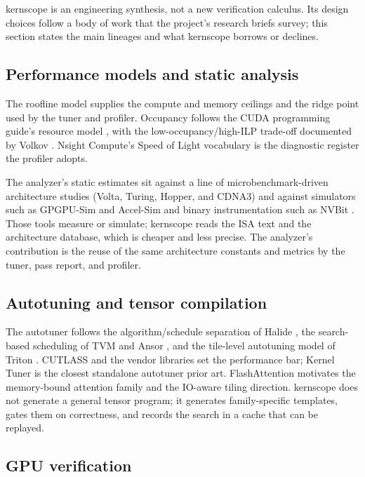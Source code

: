 kernscope is an engineering synthesis, not a new verification calculus. Its
design choices follow a body of work that the project's research briefs
survey; this section states the main lineages and what kernscope borrows or
declines.

\subsection{Performance models and static analysis}
\label{sec:prior-analysis}

The roofline model \citep{roofline2009} supplies the compute and memory
ceilings and the ridge point used by the tuner and profiler. Occupancy follows
the CUDA programming guide's resource model \citep{cudaProgrammingGuide}, with
the low-occupancy/high-ILP trade-off documented by Volkov
\citep{volkov2010}. Nsight Compute's Speed of Light vocabulary
\citep{nsightComputeSOL} is the diagnostic register the profiler adopts.

The analyzer's static estimates sit against a line of microbenchmark-driven
architecture studies (Volta, Turing, Hopper, and CDNA3) and against simulators
such as GPGPU-Sim and Accel-Sim \citep{gpgpusim2009,accelsim2020} and binary
instrumentation such as NVBit \citep{nvbit2019}. Those tools measure or
simulate; kernscope reads the ISA text and the architecture database, which is
cheaper and less precise. The analyzer's contribution is the reuse of the same
architecture constants and metrics by the tuner, pass report, and profiler.

\subsection{Autotuning and tensor compilation}
\label{sec:prior-tune}

The autotuner follows the algorithm/schedule separation of Halide
\citep{halide2013}, the search-based scheduling of TVM and Ansor
\citep{tvm2018,ansor2020}, and the tile-level autotuning model of Triton
\citep{triton2019}. CUTLASS \citep{cutlass} and the vendor libraries set the
performance bar; Kernel Tuner \citep{kerneltuner2024} is the closest standalone
autotuner prior art. FlashAttention \citep{flashattention2022} motivates the
memory-bound attention family and the IO-aware tiling direction. kernscope
does not generate a general tensor program; it generates family-specific
templates, gates them on correctness, and records the search in a cache that
can be replayed.

\subsection{GPU verification}
\label{sec:prior-verify}


